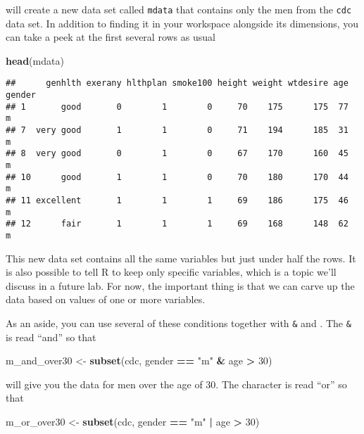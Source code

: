 \documentclass[]{article}
\newenvironment{Shaded}{\begin{snugshade}}{\end{snugshade}}
\newcommand{\KeywordTok}[1]{\textcolor[rgb]{0.13,0.29,0.53}{\textbf{#1}}}
\newcommand{\DecValTok}[1]{\textcolor[rgb]{0.00,0.00,0.81}{#1}}
\newcommand{\StringTok}[1]{\textcolor[rgb]{0.31,0.60,0.02}{#1}}
\newcommand{\OperatorTok}[1]{\textcolor[rgb]{0.81,0.36,0.00}{\textbf{#1}}}
\newcommand{\NormalTok}[1]{#1}
\begin{document}
will create a new data set called \texttt{mdata} that contains only the
men from the \texttt{cdc} data set. In addition to finding it in your
workspace alongside its dimensions, you can take a peek at the first
several rows as usual

\begin{Shaded}
\begin{Highlighting}[]
\KeywordTok{head}\NormalTok{(mdata)}
\end{Highlighting}
\end{Shaded}

\begin{verbatim}
##      genhlth exerany hlthplan smoke100 height weight wtdesire age gender
## 1       good       0        1        0     70    175      175  77      m
## 7  very good       1        1        0     71    194      185  31      m
## 8  very good       0        1        0     67    170      160  45      m
## 10      good       1        1        0     70    180      170  44      m
## 11 excellent       1        1        1     69    186      175  46      m
## 12      fair       1        1        1     69    168      148  62      m
\end{verbatim}

This new data set contains all the same variables but just under half
the rows. It is also possible to tell R to keep only specific variables,
which is a topic we'll discuss in a future lab. For now, the important
thing is that we can carve up the data based on values of one or more
variables.

As an aside, you can use several of these conditions together with
\texttt{\&} and \texttt{\textbar{}}. The \texttt{\&} is read ``and'' so
that

\begin{Shaded}
\begin{Highlighting}[]
\NormalTok{m_and_over30 <-}\StringTok{ }\KeywordTok{subset}\NormalTok{(cdc, gender }\OperatorTok{==}\StringTok{ "m"} \OperatorTok{&}\StringTok{ }\NormalTok{age }\OperatorTok{>}\StringTok{ }\DecValTok{30}\NormalTok{)}
\end{Highlighting}
\end{Shaded}

will give you the data for men over the age of 30. The
\texttt{\textbar{}} character is read ``or'' so that

\begin{Shaded}
\begin{Highlighting}[]
\NormalTok{m_or_over30 <-}\StringTok{ }\KeywordTok{subset}\NormalTok{(cdc, gender }\OperatorTok{==}\StringTok{ "m"} \OperatorTok{|}\StringTok{ }\NormalTok{age }\OperatorTok{>}\StringTok{ }\DecValTok{30}\NormalTok{)}
\end{Highlighting}
\end{Shaded}
\end{document}
